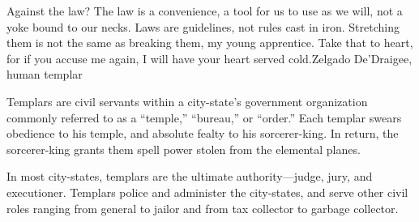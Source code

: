 {Against the law? The law is a convenience, a tool for us to use as we will, not a yoke bound to our necks. Laws are guidelines, not rules cast in iron. Stretching them is not the same as breaking them, my young apprentice. Take that to heart, for if you accuse me again, I will have your heart served cold.}{Zelgado De'Draigee, human templar}

Templars are civil servants within a city-state's government organization commonly referred to as a ``temple,'' ``bureau,'' or ``order.'' Each templar swears obedience to his temple, and absolute fealty to his sorcerer-king. In return, the sorcerer-king grants them spell power stolen from the elemental planes.

In most city-states, templars are the ultimate authority---judge, jury, and executioner. Templars police and administer the city-states, and serve other civil roles ranging from general to jailor and from tax collector to garbage collector.

